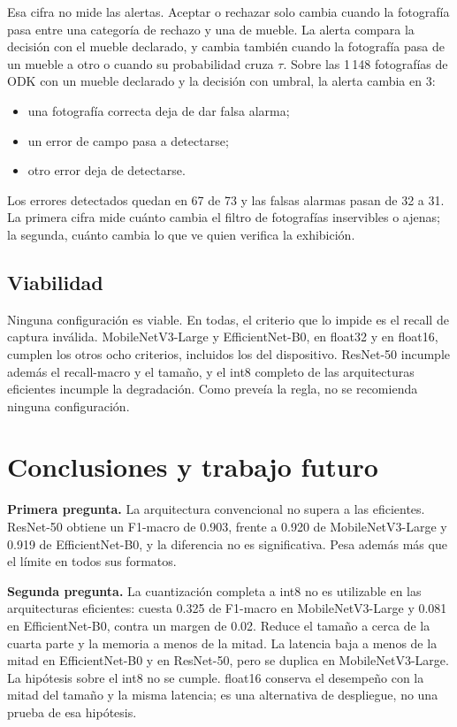 \documentclass[conference]{IEEEtran}
\begin{document}
Esa cifra no mide las alertas. Aceptar o rechazar solo cambia cuando la fotografía pasa entre una categoría de
rechazo y una de mueble. La alerta compara la decisión con el mueble declarado, y cambia también cuando la
fotografía pasa de un mueble a otro o cuando su probabilidad cruza $\tau$. Sobre las 1\,148 fotografías de ODK con
un mueble declarado y la decisión con umbral, la alerta cambia en 3:
\begin{itemize}
\item una fotografía correcta deja de dar falsa alarma;
\item un error de campo pasa a detectarse;
\item otro error deja de detectarse.
\end{itemize}
Los errores detectados quedan en 67 de 73 y las falsas alarmas pasan de 32 a 31. La primera cifra mide cuánto
cambia el filtro de fotografías inservibles o ajenas; la segunda, cuánto cambia lo que ve quien verifica la
exhibición.

\subsection{Viabilidad}

Ninguna configuración es viable. En todas, el criterio que lo impide es el recall de captura inválida.
MobileNetV3-Large y EfficientNet-B0, en float32 y en float16, cumplen los otros ocho criterios, incluidos los del
dispositivo. ResNet-50 incumple además el recall-macro y el tamaño, y el int8 completo de las arquitecturas
eficientes incumple la degradación. Como preveía la regla, no se recomienda ninguna configuración.

\section{Conclusiones y trabajo futuro}

\textbf{Primera pregunta.} La arquitectura convencional no supera a las eficientes. ResNet-50 obtiene un F1-macro
de 0.903, frente a 0.920 de MobileNetV3-Large y 0.919 de EfficientNet-B0, y la diferencia no es significativa.
Pesa además más que el límite en todos sus formatos.

\textbf{Segunda pregunta.} La cuantización completa a int8 no es utilizable en las arquitecturas eficientes:
cuesta 0.325 de F1-macro en MobileNetV3-Large y 0.081 en EfficientNet-B0, contra un margen de 0.02. Reduce el
tamaño a cerca de la cuarta parte y la memoria a menos de la mitad. La latencia baja a menos de la mitad en
EfficientNet-B0 y en ResNet-50, pero se duplica en MobileNetV3-Large. La hipótesis sobre el int8 no se cumple. float16 conserva el desempeño con la mitad del tamaño y la misma
latencia; es una alternativa de despliegue, no una prueba de esa hipótesis.
\end{document}
